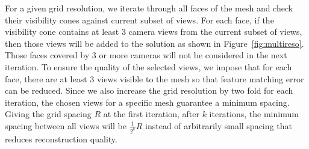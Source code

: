 For a given grid resolution, we iterate through all faces of the mesh and check their visibility cones against current subset of views. For each face, if the visibility cone contains at least 3 camera views from the current subset of views, then those views will be added to the solution as shown in Figure~\ref{fig:multireso}. Those faces covered by 3 or more cameras will not be considered in the next iteration. To ensure the quality of the selected views, we impose that for each face, there are at least 3 views visible to the mesh so that feature matching error can be reduced. Since we also increase the grid resolution by two fold for each iteration, the chosen views for a specific mesh guarantee a minimum spacing. Giving the grid spacing $R$ at the first iteration, after $k$ iterations, the minimum spacing between all views will be $\frac{1}{2^k}R$ instead of arbitrarily small spacing that reduces reconstruction quality. 
